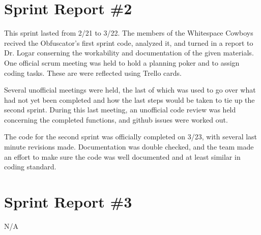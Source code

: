 \section{Sprint Report \#2}
This sprint lasted from 2/21 to 3/22. The members of the Whitespace Cowboys recived the Obfuscator's first sprint code, 
analyzed it, and turned in a report to Dr. Logar conserning the workability and documentation of the given materials. 
One official scrum meeting was held to hold a planning poker and to assign coding tasks. These are were reflected using 
Trello cards. 

Several unofficial meetings were held, the last of which was used to go over what had not yet been 
completed and how the last steps would be taken to tie up the second sprint. During this last meeting, an unofficial 
code review was held concerning the completed functions, and github issues were worked out.

The code for the second sprint was officially completed on 3/23, with several last minute 
revisions made. Documentation was double checked, and the team made an effort to make sure 
the code was well documented and at least similar in coding standard.

\section{Sprint Report \#3}
N/A
